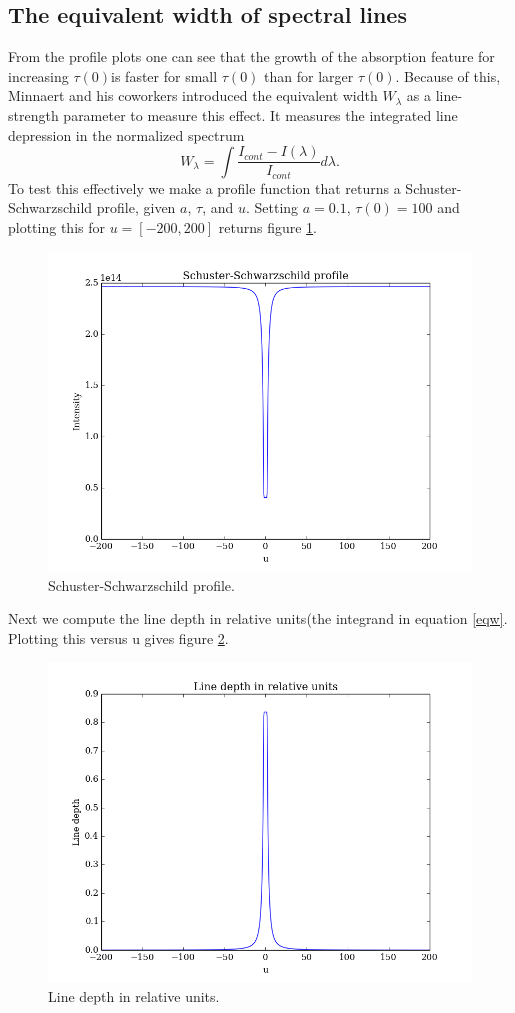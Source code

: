 \documentclass{aa}   %
\begin{document}
\subsection{The equivalent width of spectral lines}
From the profile plots one can see that the growth of the absorption feature for increasing $\tau(0)$is faster for small $\tau(0)$ than for larger $\tau(0)$. Because of this, Minnaert and his coworkers introduced the equivalent width $W_\lambda$ as a line-strength parameter to measure this effect. It measures the integrated line depression in the normalized spectrum
\begin{equation}
 W_\lambda = \int \frac{I_{cont}-I(\lambda)}{I_{cont}}d\lambda.
\end{equation}\label{eqw}
To test this effectively we make a profile function that returns a Schuster-Schwarzschild profile, given $a$, $\tau$, and $u$.  Setting $a = 0.1$, $\tau(0) = 100$ and plotting this for $ u = [-200,200]$ returns figure \ref{eqw_ss}.
\begin{figure}[hbtp]
 \includegraphics[width=.49\textwidth]{eqw_ss.png}
 \caption{Schuster-Schwarzschild profile.}
 \label{eqw_ss} 
\end{figure}

Next we compute the line depth in relative units(the integrand in equation \ref{eqw}. Plotting this versus u gives figure \ref{eqw_rel}.
\begin{figure}[hbtp]
 \includegraphics[width=.49\textwidth]{eqw_rel.png}
 \caption{Line depth in relative units.}
 \label{eqw_rel} 
\end{figure}
\end{document}

